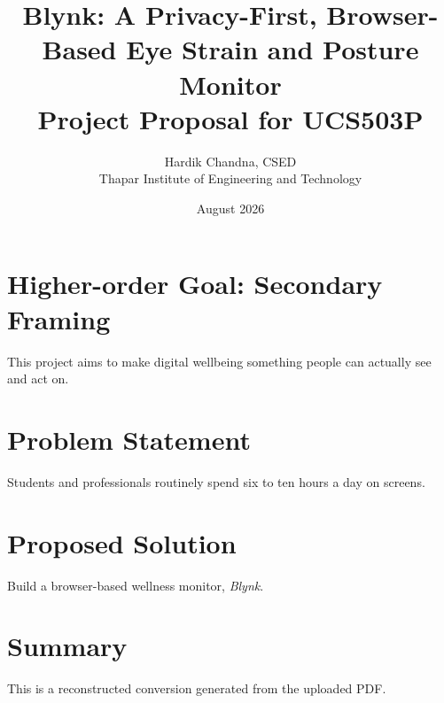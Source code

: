 \documentclass[12pt]{article}
\title{Blynk: A Privacy-First, Browser-Based Eye Strain and Posture Monitor\\[0.5em]\large Project Proposal for UCS503P}
\author{Hardik Chandna, CSED\\Thapar Institute of Engineering and Technology}
\date{August 2026}
\begin{document}
\maketitle
\section{Higher-order Goal: Secondary Framing}
This project aims to make digital wellbeing something people can actually see and act on.
\section{Problem Statement}
Students and professionals routinely spend six to ten hours a day on screens.
\section{Proposed Solution}
Build a browser-based wellness monitor, \textit{Blynk}.
\section{Summary}
This is a reconstructed conversion generated from the uploaded PDF.
\end{document}

